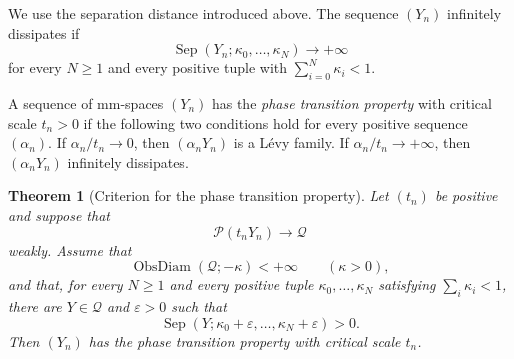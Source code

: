 \documentclass{amsart}
\numberwithin{equation}{section}
\theoremstyle{plain}
\newtheorem{thm}{Theorem}[section]
\theoremstyle{definition}
\theoremstyle{remark}
\newcommand{\Pyr}{\mathcal{P}}
\newcommand{\eps}{\varepsilon}
\DeclareMathOperator{\Sep}{Sep}
\DeclareMathOperator{\ObsDiam}{ObsDiam}
\begin{document}
We use the separation distance introduced above.  The sequence $(Y_n)$ infinitely dissipates if
\[ \Sep(Y_n;\kappa_0,\ldots,\kappa_N)\longrightarrow+\infty \]
for every $N\ge1$ and every positive tuple with
$\sum_{i=0}^N\kappa_i<1$.

A sequence of mm-spaces $(Y_n)$ has the \emph{phase transition property} with
critical scale $t_n>0$ if the following two conditions hold for every positive
sequence $(\alpha_n)$.  If $\alpha_n/t_n\to0$, then $(\alpha_nY_n)$ is a
L\'evy family.  If $\alpha_n/t_n\to+\infty$, then
$(\alpha_nY_n)$ infinitely dissipates.

\begin{thm}[Criterion for the phase transition property]
\label{thm:critical-pyramid-ptp}
	Let $(t_n)$ be positive and suppose that
	\[
		\Pyr(t_nY_n)\longrightarrow\mathcal Q
	\]
	weakly.  Assume that
\[ \ObsDiam(\mathcal Q;-\kappa)<+\infty \qquad(\kappa>0), \]
	and that, for every $N\ge1$ and every positive tuple
	$\kappa_0,\ldots,\kappa_N$ satisfying $\sum_i\kappa_i<1$, there are
	$Y\in\mathcal Q$ and $\eps>0$ such that
	\[
		\Sep(Y;\kappa_0+\eps,\ldots,\kappa_N+\eps)>0.
	\]
	Then $(Y_n)$ has the phase transition property with critical scale
	$t_n$.
\end{thm}
\end{document}
